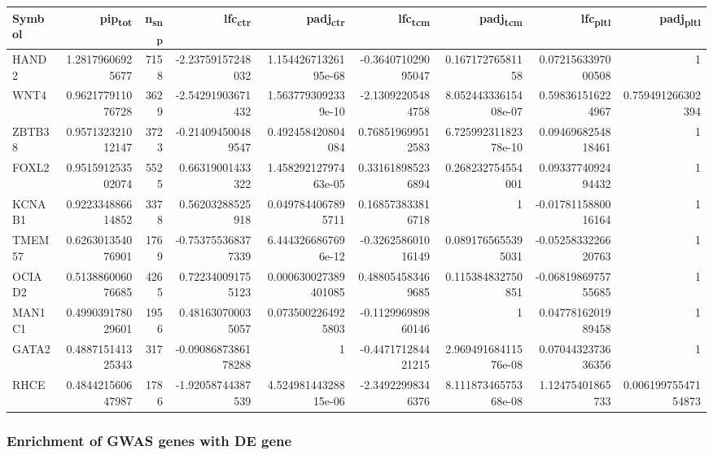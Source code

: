 \begin{center}
\begin{tabular}{lrrrrrrrr}
Symbol & pip\textsubscript{tot} & n\textsubscript{snp} & lfc\textsubscript{ctr} & padj\textsubscript{ctr} & lfc\textsubscript{tcm} & padj\textsubscript{tcm} & lfc\textsubscript{pltl} & padj\textsubscript{pltl}\\
\hline
HAND2 & 1.28179606925677 & 7158 & -2.23759157248032 & 1.15442671326195e-68 & -0.364071029095047 & 0.16717276581158 & 0.0721563397000508 & 1\\
WNT4 & 0.962177911076728 & 3629 & -2.54291903671432 & 1.5637793092339e-10 & -2.13092205484758 & 8.05244333615408e-07 & 0.598361516224967 & 0.759491266302394\\
ZBTB38 & 0.957132321012147 & 3723 & -0.214094500489547 & 0.492458420804084 & 0.768519699512583 & 6.72599231182378e-10 & 0.0946968254818461 & 1\\
FOXL2 & 0.951591253502074 & 5525 & 0.66319001433322 & 1.45829212797463e-05 & 0.331618985236894 & 0.268232754554001 & 0.0933774092494432 & 1\\
KCNAB1 & 0.922334886614852 & 3378 & 0.56203288525918 & 0.0497844067895711 & 0.168573833816718 & 1 & -0.0178115880016164 & 1\\
TMEM57 & 0.626301354076901 & 1769 & -0.753755368377339 & 6.4443266867696e-12 & -0.326258601016149 & 0.0891765655395031 & -0.0525833226620763 & 1\\
OCIAD2 & 0.513886006076685 & 4265 & 0.722340091755123 & 0.000630027389401085 & 0.488054583469685 & 0.115384832750851 & -0.0681986975755685 & 1\\
MAN1C1 & 0.499039178029601 & 1956 & 0.481630700035057 & 0.0735002264925803 & -0.112996989860146 & 1 & 0.0477816201989458 & 1\\
GATA2 & 0.488715141325343 & 317 & -0.0908687386178288 & 1 & -0.447171284421215 & 2.96949168411576e-08 & 0.0704432373636356 & 1\\
RHCE & 0.484421560647987 & 1786 & -1.92058744387539 & 4.52498144328815e-06 & -2.34922998346376 & 8.11187346575368e-08 & 1.12475401865733 & 0.00619975547154873\\
\end{tabular}
\end{center}





\subsubsection{Enrichment of GWAS genes with DE gene}\label{sec:org087a07a}

